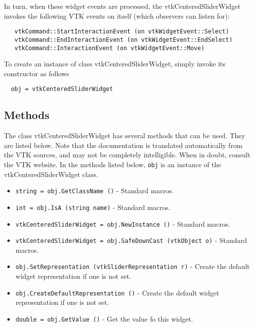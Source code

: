  In turn, when these widget events are processed, the vtkCenteredSliderWidget
 invokes the following VTK events on itself (which observers can listen for):
 \begin{verbatim}
   vtkCommand::StartInteractionEvent (on vtkWidgetEvent::Select)
   vtkCommand::EndInteractionEvent (on vtkWidgetEvent::EndSelect)
   vtkCommand::InteractionEvent (on vtkWidgetEvent::Move)
 \end{verbatim}


To create an instance of class vtkCenteredSliderWidget, simply
invoke its constructor as follows
\begin{verbatim}
  obj = vtkCenteredSliderWidget
\end{verbatim}
\subsection{Methods}

The class vtkCenteredSliderWidget has several methods that can be used.
  They are listed below.
Note that the documentation is translated automatically from the VTK sources,
and may not be completely intelligible.  When in doubt, consult the VTK website.
In the methods listed below, \verb|obj| is an instance of the vtkCenteredSliderWidget class.
\begin{itemize}
\item  \verb|string = obj.GetClassName ()| -  Standard macros.

\item  \verb|int = obj.IsA (string name)| -  Standard macros.

\item  \verb|vtkCenteredSliderWidget = obj.NewInstance ()| -  Standard macros.

\item  \verb|vtkCenteredSliderWidget = obj.SafeDownCast (vtkObject o)| -  Standard macros.

\item  \verb|obj.SetRepresentation (vtkSliderRepresentation r)| -  Create the default widget representation if one is not set. 

\item  \verb|obj.CreateDefaultRepresentation ()| -  Create the default widget representation if one is not set. 

\item  \verb|double = obj.GetValue ()| -  Get the value fo this widget. 

\end{itemize}
